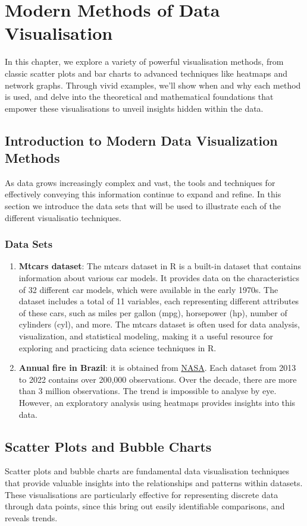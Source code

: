 \documentclass{article}\usepackage[]{graphicx}\usepackage[]{xcolor}
\begin{document}
\newpage

\section{Modern Methods of Data Visualisation}
In this chapter, we explore a variety of powerful visualisation methods, from classic scatter plots and bar charts to advanced techniques like heatmaps and network graphs. Through vivid examples, we'll show when and why each method is used, and delve into the theoretical and mathematical foundations that empower these visualisations to unveil insights hidden within the data.

\subsection{Introduction to Modern Data Visualization Methods}
As data grows increasingly complex and vast, the tools and techniques for effectively conveying this information continue to expand and refine. In this section we introduce the data sets that will be used to illustrate each of the different visualisatio techniques. 

\subsubsection{Data Sets}
\begin{enumerate}
\item \textbf{Mtcars dataset}: The mtcars dataset in R is a built-in dataset that contains information about various car models. It provides data on the characteristics of 32 different car models, which were available in the early 1970s. The dataset includes a total of 11 variables, each representing different attributes of these cars, such as miles per gallon (mpg), horsepower (hp), number of cylinders (cyl), and more. The mtcars dataset is often used for data analysis, visualization, and statistical modeling, making it a useful resource for exploring and practicing data science techniques in R.
\item \textbf{Annual fire in Brazil}: it is obtained from \href{https://firms.modaps.eosdis.nasa.gov/}{NASA}. Each dataset from 2013 to 2022 contains over 200,000 observations. Over the decade, there are more than 3 million observations. The trend is impossible to analyse by eye. However, an exploratory analysis using heatmaps provides insights into this data.
\end{enumerate}

\subsection{Scatter Plots and Bubble Charts}
Scatter plots and bubble charts are fundamental data visualisation techniques that provide valuable insights into the relationships and patterns within datasets. These visualisations are particularly effective for representing discrete data through data points, since this bring out easily identifiable comparisons, and reveals trends.
\end{document}
